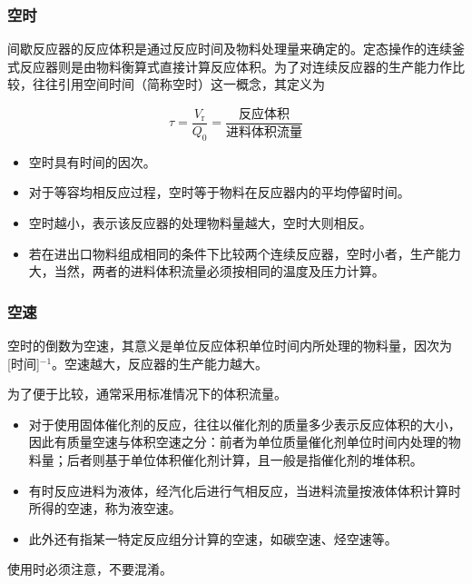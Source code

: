 \documentclass[dvipsnames, svgnames, x11names]{beamer}
\begin{document}
\begin{frame}
    \frametitle{空时}

    间歇反应器的反应体积是通过反应时间及物料处理量来确定的。定态操作的连续釜式反应器则是由物料衡算式直接计算反应体积。为了对连续反应器的生产能力作比较，往往引用空间时间（简称空时）这一概念，其定义为
    
    \[\tau = \frac{V_\mathrm{r}}{Q_0} = \frac{\text{反应体积}}{\text{进料体积流量}}\]

    \begin{itemize}
        \item[\bullet] 空时具有时间的因次。
        \item[\bullet] 对于等容均相反应过程，空时等于物料在反应器内的平均停留时间。
        \item[\bullet] 空时越小，表示该反应器的处理物料量越大，空时大则相反。
        \item[\bullet] 若在进出口物料组成相同的条件下比较两个连续反应器，空时小者，生产能力大，当然，两者的进料体积流量必须按相同的温度及压力计算。
    \end{itemize}


\end{frame}


\begin{frame}
    \frametitle{空速}

    空时的倒数为空速，其意义是单位反应体积单位时间内所处理的物料量，因次为[时间]$^{-1}$。空速越大，反应器的生产能力越大。

    为了便于比较，通常采用标准情况下的体积流量。
    \begin{itemize}
        \item[\bullet] 对于使用固体催化剂的反应，往往以催化剂的质量多少表示反应体积的大小，因此有质量空速与体积空速之分：前者为单位质量催化剂单位时间内处理的物料量；后者则基于单位体积催化剂计算，且一般是指催化剂的堆体积。

        \item[\bullet] 有时反应进料为液体，经汽化后进行气相反应，当进料流量按液体体积计算时所得的空速，称为液空速。

        \item[\bullet] 此外还有指某一特定反应组分计算的空速，如碳空速、烃空速等。
    \end{itemize}
    使用时必须注意，不要混淆。
\end{frame}
\end{document}

